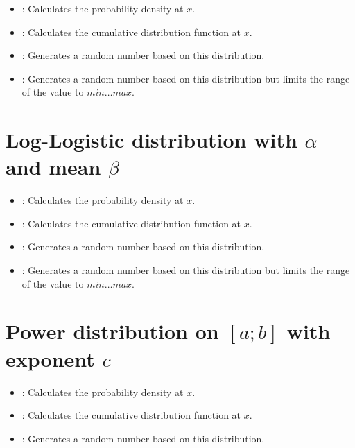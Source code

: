 \begin{itemize}

\item
{}:
Calculates the probability density at $x$.

\item
{}:
Calculates the cumulative distribution function at $x$.

\item
{}:
Generates a random number based on this distribution.

\item
{}:
Generates a random number based on this distribution but limits the range of the value to $min\ldots max$.

\end{itemize}



\section{Log-Logistic distribution with \texorpdfstring{$\alpha$}{alpha} and mean \texorpdfstring{$\beta$}{beta}}

\begin{itemize}

\item
{}:
Calculates the probability density at $x$.

\item
{}:
Calculates the cumulative distribution function at $x$.

\item
{}:
Generates a random number based on this distribution.

\item
{}:
Generates a random number based on this distribution but limits the range of the value to $min\ldots max$.

\end{itemize}



\section{Power distribution on \texorpdfstring{$[a;b]$}{[a;b]} with exponent \texorpdfstring{$c$}{c}}

\begin{itemize}

\item
{}:
Calculates the probability density at $x$.

\item
{}:
Calculates the cumulative distribution function at $x$.

\item
{}:
Generates a random number based on this distribution.

\end{itemize}



